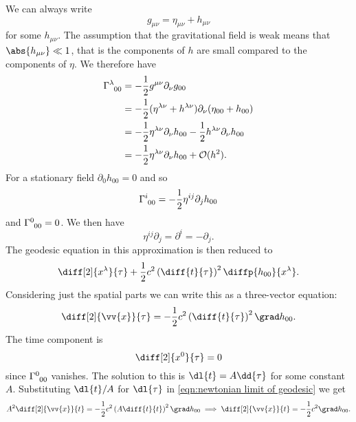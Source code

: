 \documentclass[fleqn]{NotesClass}
\newcommand*{\christoffel}[3]{\tensor{\Gamma}{^{#1}_{{#2}{#3}}}}
\newcommand*{\order}{\mathcal{O}}
\begin{document}
    We can always write
    \begin{equation}
        g_{\mu\nu} = \eta_{\mu\nu} + h_{\mu\nu}
    \end{equation}
    for some \(h_{\mu\nu}\).
    The assumption that the gravitational field is weak means that \(\abs{h_{\mu\nu}} \ll 1\), that is the components of \(h\) are small compared to the components of \(\eta\).
    We therefore have
    \begin{align}
        \christoffel{\lambda}{0}{0} &= -\frac{1}{2}g^{\mu\nu}\partial_\nu g_{00}\\
        &= -\frac{1}{2}(\eta^{\lambda\nu} + h^{\lambda\nu})\partial_\nu(\eta_{00} + h_{00})\\
        &= -\frac{1}{2} \eta^{\lambda\nu} \partial_\nu h_{00} - \frac{1}{2} h^{\lambda\nu} \partial_\nu h_{00}\\
        &= -\frac{1}{2} \eta^{\lambda\nu} \partial_\nu h_{00} + \order(h^2).
    \end{align}
    For a stationary field \(\partial_0 h_{00} = 0\) and so
    \begin{equation}
        \christoffel{i}{0}{0} = -\frac{1}{2}\eta^{ij}\partial_j h_{00}
    \end{equation}
    and \(\christoffel{0}{0}{0} = 0\).
    We then have
    \begin{equation}
        \eta^{ij}\partial_j = \partial^i = -\partial_j.
    \end{equation}
    The geodesic equation in this approximation is then reduced to
    \begin{equation}
        \diff[2]{x^\lambda}{\tau} + \frac{1}{2} c^2 \left( \diff{t}{\tau} \right)^2 \diffp{h_{00}}{x^\lambda}.
    \end{equation}
    Considering just the spatial parts we can write this as a three-vector equation:
    \begin{equation}\label{eqn:newtonian limit of geodesic}
        \diff[2]{\vv{x}}{\tau} = -\frac{1}{2}c^2 \left( \diff{t}{\tau} \right)^2 \grad h_{00}.
    \end{equation}
    The time component is
    \begin{equation}
        \diff[2]{x^0}{\tau} = 0
    \end{equation}
    since \(\christoffel{0}{0}{0}\) vanishes.
    The solution to this is \(\dl{t} = A\dd{\tau}\) for some constant \(A\).
    Substituting \(\dl{t}/A\) for \(\dl{\tau}\) in \cref{eqn:newtonian limit of geodesic} we get
    \begin{equation}
        A^2\diff[2]{\vv{x}}{t} = -\frac{1}{2}c^2\left( A\diff{t}{t} \right)^2 \grad h_{00} \implies \diff[2]{\vv{x}}{t} = -\frac{1}{2}c^2 \grad h_{00}.
    \end{equation}
    
\end{document}
